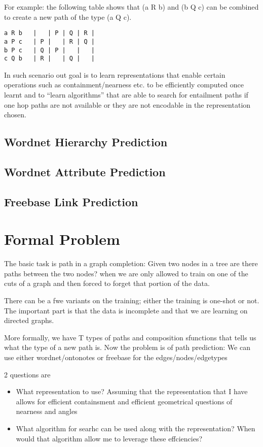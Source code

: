 \documentclass[11pt]{article}
\begin{document}
For example: the following table shows that (a R b) and (b Q c) can be
combined to create a new path of the type (a Q c).
\begin{verbatim}
a R b   |   | P | Q | R |
a P c   | P |   | R | Q |
b P c   | Q | P |   |   |
c Q b   | R |   | Q |   |
\end{verbatim}


In such scenario out goal is to learn representations that enable
certain operations such as containment/nearness etc. to be efficiently
computed once learnt and to ``learn algorithms'' that are able to
search for entailment paths if one hop paths are not available or they
are not encodable in the representation chosen.

\subsection{Wordnet Hierarchy Prediction}
\label{sec:wordn-hier-pred}


\subsection{Wordnet Attribute Prediction}
\label{sec:wordn-attr-pred}



\subsection{Freebase Link Prediction}
\label{sec:freeb-link-pred}

\section{Formal Problem}
\label{sec:formal-problem}
The basic task is path in a graph completion: Given two nodes in a
tree are there paths between the two nodes? when we are only allowed
to train on one of the cuts of a graph and then forced to forget that
portion of the data.

There can be a fwe variants on the training; either the training is
one-shot or not. The important part is that the data is incomplete and
that we are learning on directed graphs.

More formally, we have T types of paths and composition sfunctions
that tells us what the type of a new path is. Now the problem is of
path prediction: We can use either wordnet/ontonotes or freebase for
the edges/nodes/edgetypes

2 questions are
\begin{itemize}
\item What representation to use? Assuming that the representation
  that I have allows for efficient containsment and efficient
  geometrical questions of nearness and angles
\item What algorithm for searhc can be used along with the
  representation? When would that algorithm allow me to leverage these effciencies?
\end{itemize}
\end{document}
